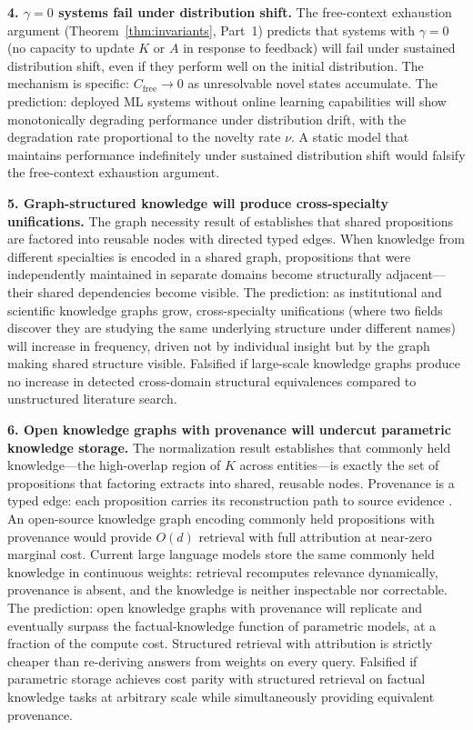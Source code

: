 \documentclass[11pt]{article}
\theoremstyle{definition}
\theoremstyle{remark}
\begin{document}
\textbf{4. $\gamma = 0$ systems fail under distribution shift.}
The free-context exhaustion argument
(Theorem~\ref{thm:invariants}, Part~1) predicts that systems with
$\gamma = 0$ (no capacity to update $K$ or $A$ in response to
feedback) will fail under sustained distribution shift, even if they
perform well on the initial distribution. The mechanism is specific:
$C_{\mathrm{free}} \to 0$ as unresolvable novel states accumulate.
The prediction: deployed ML systems without online learning
capabilities will show monotonically degrading performance under
distribution drift, with the degradation rate proportional to the
novelty rate $\nu$. A static model that maintains performance
indefinitely under sustained distribution shift would falsify the
free-context exhaustion argument.

\textbf{5. Graph-structured knowledge will produce cross-specialty
unifications.}
The graph necessity result of \cite{McCarthy2026a}
establishes that shared propositions are factored into reusable nodes
with directed typed edges. When knowledge from different specialties
is encoded in a shared graph, propositions that were independently
maintained in separate domains become structurally adjacent---their
shared dependencies become visible. The prediction: as institutional
and scientific knowledge graphs grow, cross-specialty unifications
(where two fields discover they are studying the same underlying
structure under different names) will increase in frequency, driven
not by individual insight but by the graph making shared structure
visible. Falsified if large-scale knowledge graphs produce no
increase in detected cross-domain structural equivalences compared
to unstructured literature search.

\textbf{6. Open knowledge graphs with provenance will undercut
parametric knowledge storage.}
The normalization result \cite{McCarthy2026b} establishes that
commonly held knowledge---the high-overlap region of $K$ across
entities---is exactly the set of propositions that factoring extracts
into shared, reusable nodes. Provenance is a typed edge:
each proposition carries its reconstruction path to source evidence
\cite{McCarthy2026a}. An open-source knowledge graph encoding commonly
held propositions with provenance would provide $O(d)$ retrieval with
full attribution at near-zero marginal cost. Current large language
models store the same commonly held knowledge in continuous weights:
retrieval recomputes relevance dynamically, provenance is absent,
and the knowledge is neither inspectable nor correctable. The prediction: open knowledge
graphs with provenance will replicate and eventually surpass the
factual-knowledge function of parametric models, at a fraction of
the compute cost. Structured retrieval with attribution is
strictly cheaper than re-deriving answers from weights on every query.
Falsified if parametric storage achieves cost parity with structured
retrieval on factual knowledge tasks at arbitrary scale while
simultaneously providing equivalent provenance.
\end{document}
